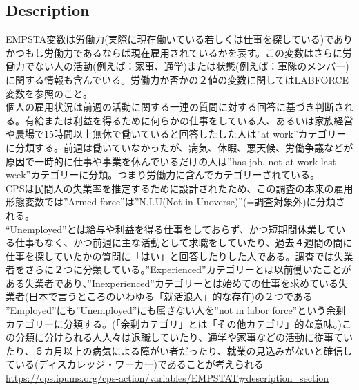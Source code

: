\documentclass{jsarticle}
\begin{document}
\subsection{Description}
EMPSTA変数は労働力(実際に現在働いている若しくは仕事を探している)でありかつもし労働力であるならば現在雇用されているかを表す。この変数はさらに労働力でない人の活動(例えば：家事、通学)または状態(例えば：軍隊のメンバー)に関する情報も含んでいる。労働力か否かの２値の変数に関してはLABFORCE変数を参照のこと。\\
  
個人の雇用状況は前週の活動に関する一連の質問に対する回答に基づき判断される。有給または利益を得るために何らかの仕事をしている人、あるいは家族経営や農場で15時間以上無休で働いていると回答したした人は”at work”カテゴリーに分類する。前週は働いていなかったが、病気、休暇、悪天候、労働争議などが原因で一時的に仕事や事業を休んでいるだけの人は”has job, not at work last week”カテゴリーに分類。つまり労働力に含んでカテゴリーされている。\\
  
CPSは民間人の失業率を推定するために設計されたため、この調査の本来の雇用形態変数では”Armed force”は”N.I.U(Not in Unoverse)”(=調査対象外)に分類される。\\
  
“Unemployed”とは給与や利益を得る仕事をしておらず、かつ短期間休業している仕事もなく、かつ前週に主な活動として求職をしていたり、過去４週間の間に仕事を探していたかの質問に「はい」と回答したりした人である。調査では失業者をさらに２つに分類している。”Experienced”カテゴリーとは以前働いたことがある失業者であり、”Inexperienced”カテゴリーとは始めての仕事を求めている失業者(日本で言うところのいわゆる「就活浪人」的な存在)の２つである\\
  
”Employed”にも”Unemployed”にも属さない人を”not in labor force”という余剰カテゴリーに分類する。(「余剰カテゴリ」とは「その他カテゴリ」的な意味。)この分類に分けられる人人々は退職していたり、通学や家事などの活動に従事ていたり、６カ月以上の病気による障がい者だったり、就業の見込みがないと確信している(ディスカレッジ・ワーカー)であることが考えられる\\
\url{https://cps.ipums.org/cps-action/variables/EMPSTAT#description_section}
\end{document}
